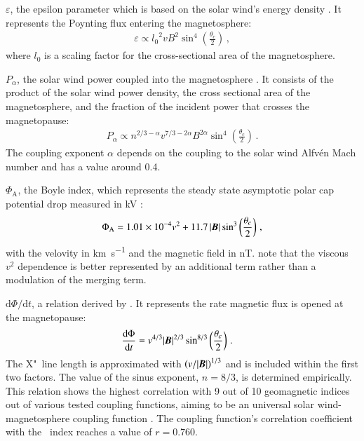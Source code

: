 \begin{itemize*}
	\item $\varepsilon$, the epsilon parameter which is based on the solar wind's energy density \citep{Perreault1978}. It represents the Poynting flux entering the magnetosphere:
	\begin{align}
		\varepsilon \propto {l_0}^2 v B^2 \sin^4\left(\frac{\theta_c}{2}\right)	\,,
	\end{align}
	where $l_0$ is a scaling factor for the cross-sectional area of the magnetosphere.
	
	\item $P_\alpha$, the solar wind power coupled into the magnetosphere \citep{Stamper1999,Lockwood2013}. It consists of the product of the solar wind power density, the cross sectional area of the magnetosphere, and the fraction of the incident power that crosses the magnetopause:
	\begin{align}
		P_\alpha \propto n^{2/3 - \alpha} v^{7/3 - 2 \alpha} B^{2 \alpha} \sin^4\left(\frac{\theta_c}{2}\right)	\,.
	\end{align}
	The coupling exponent $\alpha$ depends on the coupling to the solar wind Alfvén Mach number and has a value around 0.4.

	\item $\Phi_\text{A}$, the Boyle index, which represents the steady state asymptotic polar cap potential drop measured in \si{\kilo\volt} \citep{Boyle1997}:
	\begin{align}
		\Phi_\text{A} = \num{1.01e-4} v^2 + 11.7\,|\boldsymbol{B}| \sin^{3}\left(\frac{\theta_c}{2}\right)	\,,
	\end{align}
	with the velovity in \si{\km\per\s} and the magnetic field in \si{\nano\tesla}. \citet{Boyle1997} note that the viscous $v^2$ dependence is better represented by an additional term rather than a modulation of the merging term.
	
	\item $\text{d}\Phi / \text{d}t$, a relation derived by \citet{Newell2007}. It represents the rate magnetic flux is opened at the magnetopause:
	\begin{align}
		\frac{\text{d}\Phi}{\text{d}t} &= v^{4/3} |\boldsymbol{B}|^{2/3} \sin^{8/3}\left(\frac{\theta_c}{2}\right)	\,.	\label{eq:newell_merging_function}
	\end{align}
	The X"~line length is approximated with $\left(v / |\boldsymbol{B}|\right)^{1/3}$ and is included within the first two factors. The value of the sinus exponent, $n = 8/3$, is determined empirically. This relation shows the highest correlation with 9 out of 10 geomagnetic indices out of various tested coupling functions, aiming to be an universal solar wind-magnetosphere coupling function \citep{Newell2007}. The coupling function's correlation coefficient with the \Kp~index reaches a value of $r = 0.760$.
	

\end{itemize*}
